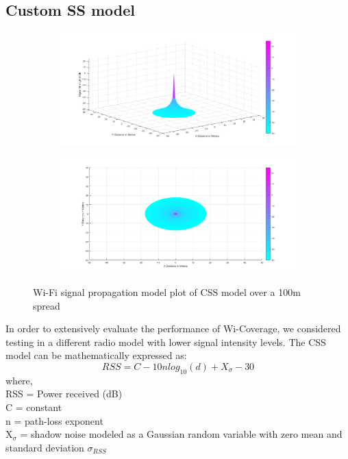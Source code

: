 \subsection{Custom SS model}
\begin{figure}
\centering
	\begin{subfigure}[b]{\textwidth}
		\includegraphics[width=\textwidth]{images/FAL_rm_3d.png}
		\label{subfig:a}
		\caption{}
	\end{subfigure}
	\begin{subfigure}[b]{\textwidth}
		\includegraphics[width=\textwidth]{images/FAL_rm_tv.png}
		\label{subfig:b}
		\caption{}
	\end{subfigure}
\caption{Wi-Fi signal propagation model plot of CSS model over a 100m spread}
\end{figure}
In order to extensively evaluate the performance of Wi-Coverage, we considered testing in a different radio model with lower signal intensity levels. The CSS model can be mathematically expressed as\cite{30}:
\begin{equation}
    RSS = C - 10nlog_{10}(d) + X_\sigma - 30
\end{equation}
where,\\
RSS = Power received (dB)\\
C = constant\\
n = path-loss exponent\\
X$_\sigma$ = shadow noise modeled as a Gaussian random variable with zero mean and standard deviation $\sigma_{RSS}$

